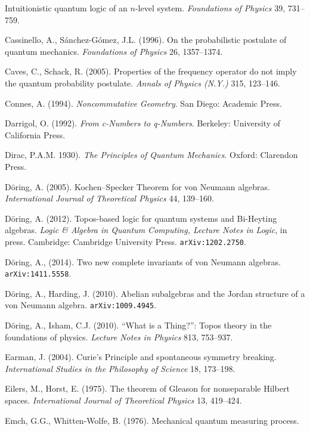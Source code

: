 \documentclass[12pt]{article}
\begin{document}
\begin{footnotesize}
\begin{trivlist}
Intuitionistic quantum logic of an $n$-level system. \emph{Foundations of Physics} 39, 731--759.
\item
 Cassinello, A., S\'{a}nchez-G\'{o}mez, J.L. (1996).
 On the probabilistic postulate of quantum mechanics. \emph{Foundations of  Physics} 26, 1357--1374. 
\item Caves, C.,  Schack,  R. (2005). Properties of the frequency operator do not imply the quantum probability postulate.
 \emph{Annals of Physics (N.Y.)}
 315, 123--146.
\item Connes, A. (1994). \emph{Noncommutative
Geometry}. San Diego: Academic Press. 
\item Darrigol, O. (1992). \emph{From c-Numbers to q-Numbers}.  Berkeley: University of California Press. 
\item Dirac, P.A.M. 1930). \emph{The Principles of Quantum
Mechanics}. Oxford: Clarendon Press. 
\item  D\"{o}ring, A. (2005). Kochen--Specker Theorem for von Neumann algebras.
\emph{International Journal of Theoretical Physics} 44, 139--160.
\item  D\"{o}ring, A. (2012). Topos-based logic for quantum systems and Bi-Heyting algebras.
\emph{Logic \& Algebra in Quantum Computing, Lecture Notes in Logic}, in press. Cambridge: Cambridge University Press.
\texttt{arXiv:1202.2750}.
\item D\"{o}ring, A., (2014). Two new complete invariants of von Neumann algebras.
\texttt{arXiv:1411.5558}.
\item D\"{o}ring, A., Harding, J. (2010). Abelian subalgebras and the Jordan structure of a von Neumann algebra.
\texttt{arXiv:1009.4945}.
\item D\"{o}ring, A., Isham, C.J. (2010). ``What is a Thing?'': Topos theory in the foundations of physics. 
\emph{Lecture Notes in Physics} 813, 753--937.
\item Earman, J. (2004). Curie's Principle and spontaneous symmetry breaking. \emph{International Studies in the Philosophy of Science} 18, 173--198. 
\item Eilers, M., Horst, E. (1975). The theorem of Gleason for nonseparable Hilbert spaces.
\emph{International Journal of Theoretical Physics} 13, 419--424.
\item  Emch, G.G.,  Whitten-Wolfe, B. (1976). Mechanical quantum measuring process.

\end{trivlist}
\end{footnotesize}
\end{document}
